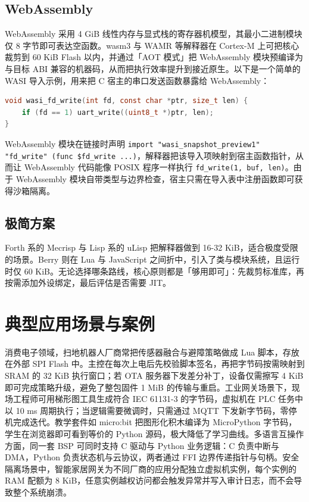 \section{WebAssembly}
WebAssembly 采用 4 GiB 线性内存与显式栈的寄存器机模型，其最小二进制模块仅 8 字节即可表达空函数。wasm3 与 WAMR 等解释器在 Cortex-M 上可把核心裁剪到 60 KiB Flash 以内，并通过「AOT 模式」把 WebAssembly 模块预编译为与目标 ABI 兼容的机器码，从而把执行效率提升到接近原生。以下是一个简单的 WASI 导入示例，用来把 C 宿主的串口发送函数暴露给 WebAssembly：\par
\begin{lstlisting}[language=c]
void wasi_fd_write(int fd, const char *ptr, size_t len) {
    if (fd == 1) uart_write((uint8_t *)ptr, len);
}
\end{lstlisting}
WebAssembly 模块在链接时声明 \texttt{import "wasi\_{}snapshot\_{}preview1" "fd\_{}write" (func \${}fd\_{}write ...)}，解释器把该导入项映射到宿主函数指针，从而让 WebAssembly 代码能像 POSIX 程序一样执行 \texttt{fd\_{}write(1, buf, len)}。由于 WebAssembly 模块自带类型与边界检查，宿主只需在导入表中注册函数即可获得沙箱隔离。\par
\section{极简方案}
Forth 系的 Mecrisp 与 Lisp 系的 uLisp 把解释器做到 16-32 KiB，适合极度受限的场景。Berry 则在 Lua 与 JavaScript 之间折中，引入了类与模块系统，且运行时仅 60 KiB。无论选择哪条路线，核心原则都是「够用即可」：先裁剪标准库，再按需添加外设绑定，最后评估是否需要 JIT。\par
\chapter{典型应用场景与案例}
消费电子领域，扫地机器人厂商常把传感器融合与避障策略做成 Lua 脚本，存放在外部 SPI Flash 中。主控在每次上电后先校验脚本签名，再把字节码按需映射到 SRAM 的 32 KiB 执行窗口；若 OTA 服务器下发差分补丁，设备仅需擦写 4 KiB 即可完成策略升级，避免了整包固件 1 MiB 的传输与重启。工业网关场景下，现场工程师可用梯形图工具生成符合 IEC 61131-3 的字节码，虚拟机在 PLC 任务中以 10 ms 周期执行；当逻辑需要微调时，只需通过 MQTT 下发新字节码，零停机完成迭代。教学套件如 micro:bit 把图形化积木编译为 MicroPython 字节码，学生在浏览器即可看到等价的 Python 源码，极大降低了学习曲线。多语言互操作方面，同一套 BSP 可同时支持 C 驱动与 Python 业务逻辑：C 负责中断与 DMA，Python 负责状态机与云协议，两者通过 FFI 边界传递指针与句柄。安全隔离场景中，智能家居网关为不同厂商的应用分配独立虚拟机实例，每个实例的 RAM 配额为 8 KiB，任意实例越权访问都会触发异常并写入审计日志，而不会导致整个系统崩溃。\par
